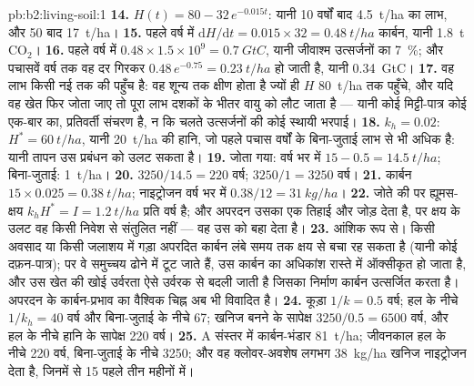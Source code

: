 \begin{solution}{pb:b2:living-soil:1}
\textbf{14.} $H(t) = 80 - 32\,e^{-0.015t}$: यानी 10 वर्षों बाद \qty{4.5}{t/ha}
का लाभ, और 50 बाद \qty{17}{t/ha}।
\textbf{15.} पहले वर्ष में $\mathrm{d}H/\mathrm{d}t = 0.015\times 32 =
\qty{0.48}{t/ha}$ कार्बन, यानी \qty{1.8}{t}
$\mathrm{CO_2}$।
\textbf{16.} पहले वर्ष में $0.48\times 1.5\times 10^{9} = \qty{0.7}{GtC}$,
यानी जीवाश्म उत्सर्जनों का \qty{7}{\%}; और पचासवें वर्ष तक
वह दर गिरकर $0.48\,e^{-0.75} = \qty{0.23}{t/ha}$ हो जाती है,
यानी \qty{0.34}{GtC}।
\textbf{17.} वह लाभ किसी नई  तक की पहुँच है: वह
शून्य तक क्षीण होता है ज्यों ही $H$ \qty{80}{t/ha} तक पहुँचे, और यदि वह खेत फिर जोता जाए तो
पूरा लाभ दशकों के भीतर वायु को लौट जाता है
--- यानी कोई मिट्टी-पात्र कोई एक-बार का, प्रतिवर्ती संचरण है, न कि चलते उत्सर्जनों की कोई
स्थायी भरपाई।
\textbf{18.} $k_h = 0.02$: $H^{*} = \qty{60}{t/ha}$, यानी
\qty{20}{t/ha} की हानि, जो पहले पचास वर्षों के बिना-जुताई लाभ से भी अधिक है:
यानी तापन उस प्रबंधन को
उलट सकता है।
\textbf{19.} जोता गया: वर्ष भर में $15 - 0.5 = \qty{14.5}{t/ha}$; बिना-जुताई:
\qty{1}{t/ha}।
\textbf{20.} $3250/14.5 = 220$ वर्ष; $3250/1 = 3250$ वर्ष।
\textbf{21.} कार्बन $15\times 0.025 = \qty{0.38}{t/ha}$; नाइट्रोजन
वर्ष भर में $0.38/12 = \qty{31}{kg/ha}$।
\textbf{22.} जोते की  पर ह्यूमस-क्षय $k_hH^{*} =
I = \qty{1.2}{t/ha}$ प्रति वर्ष है; और अपरदन उसका एक तिहाई और जोड़ देता है,
पर क्षय के उलट वह किसी निवेश से संतुलित नहीं --- वह उस
 को बहा देता है।
\textbf{23.} आंशिक रूप से। किसी अवसाद या किसी जलाशय में गड़ा
अपरदित कार्बन लंबे समय तक क्षय से बचा रह सकता है (यानी कोई
दफ़न-पात्र); पर वे समुच्चय ढोने में टूट जाते हैं, उस कार्बन का अधिकांश
रास्ते में ऑक्सीकृत हो जाता है, और उस खेत की खोई उर्वरता
ऐसे उर्वरक से बदली जाती है जिसका निर्माण कार्बन उत्सर्जित करता है। अपरदन के कार्बन-प्रभाव का
वैश्विक चिह्न अब भी विवादित है।
\textbf{24.} कूड़ा $1/k = 0.5$ वर्ष;  हल के नीचे $1/k_h = 40$ वर्ष
और बिना-जुताई के नीचे 67; खनिज  बनने के सापेक्ष $3250/0.5 =
6500$ वर्ष, और हल के नीचे हानि के सापेक्ष 220
वर्ष।
\textbf{25.} A संस्तर में कार्बन-भंडार \qty{81}{t/ha}; जीवनकाल
हल के नीचे 220 वर्ष, बिना-जुताई के नीचे 3250; और वह क्लोवर-अवशेष
लगभग \qty{38}{kg/ha} खनिज नाइट्रोजन देता है, जिनमें से 15
पहले तीन महीनों में।
\end{solution}
